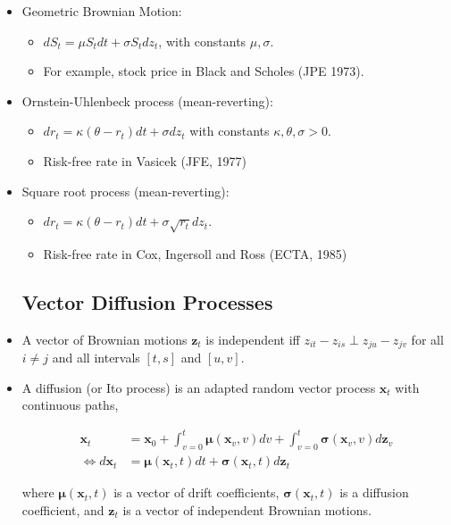 \documentclass{article}
\newcommand{\xvec}{\mathbf{x}}
\newcommand{\zvec}{\mathbf{z}}
\newcommand{\muvec}{\boldsymbol{\mu}}
\newcommand{\sigmamat}{\boldsymbol{\sigma}}
\begin{document}
\begin{itemize}
\item Geometric Brownian Motion:

\begin{itemize}
\item $dS_t = \mu S_t dt + \sigma S_t dz_t$, with constants $\mu, \sigma$.
\item For example, stock price in Black and Scholes (JPE 1973).
\end{itemize}

\item Ornstein-Uhlenbeck process (mean-reverting): 

\begin{itemize}
\item $dr_t = \kappa (\theta - r_t)dt + \sigma dz_t$ with constants $\kappa, \theta, \sigma > 0$.
\item Risk-free rate in Vasicek (JFE, 1977)
\end{itemize}

\item Square root process (mean-reverting): 

\begin{itemize}
\item $dr_t = \kappa(\theta - r_t) dt + \sigma \sqrt{r_t} dz_t$.
\item Risk-free rate in Cox, Ingersoll and Ross (ECTA, 1985)
\end{itemize}

\pagebreak

\subsection*{Vector Diffusion Processes}

\item A vector of Brownian motions $\zvec_t$ is independent iff $z_{it} - z_{is} \perp z_{ju} - z_{jv}$ for all $i \neq j$ and all intervals $[t, s]$ and $[u, v]$.

\item A diffusion (or Ito process) is an adapted random vector process $\mathbf{x}_t$ with continuous paths,

\begin{align*}
\xvec_t &= \xvec_0 + \int_{v=0}^t \muvec(\xvec_v, v)dv + \int_{v=0}^t \sigmamat(\xvec_v, v) d\zvec_v \\
\iff d\xvec_t &= \muvec(\xvec_t, t)dt + \sigmamat(\xvec_t, t) d\zvec_t
\end{align*}

where $\muvec(\xvec_t, t)$ is a vector of drift coefficients, $\sigmamat(\xvec_t, t)$ is a diffusion coefficient, and $\zvec_t$ is a vector of independent Brownian motions.


\end{itemize}
\end{document}
